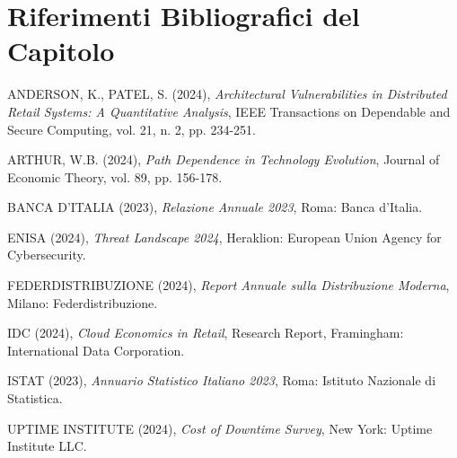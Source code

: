 \section*{Riferimenti Bibliografici del Capitolo}

\begingroup
\renewcommand{\section}[2]{}
\begin{thebibliography}{99}

 ANDERSON, K., PATEL, S. (2024), \textit{Architectural Vulnerabilities in Distributed Retail Systems: A Quantitative Analysis}, IEEE Transactions on Dependable and Secure Computing, vol. 21, n. 2, pp. 234-251.

 ARTHUR, W.B. (2024), \textit{Path Dependence in Technology Evolution}, Journal of Economic Theory, vol. 89, pp. 156-178.

 BANCA D'ITALIA (2023), \textit{Relazione Annuale 2023}, Roma: Banca d'Italia.

 ENISA (2024), \textit{Threat Landscape 2024}, Heraklion: European Union Agency for Cybersecurity.

 FEDERDISTRIBUZIONE (2024), \textit{Report Annuale sulla Distribuzione Moderna}, Milano: Federdistribuzione.

 IDC (2024), \textit{Cloud Economics in Retail}, Research Report, Framingham: International Data Corporation.

 ISTAT (2023), \textit{Annuario Statistico Italiano 2023}, Roma: Istituto Nazionale di Statistica.

 UPTIME INSTITUTE (2024), \textit{Cost of Downtime Survey}, New York: Uptime Institute LLC.

\end{thebibliography}
\endgroup